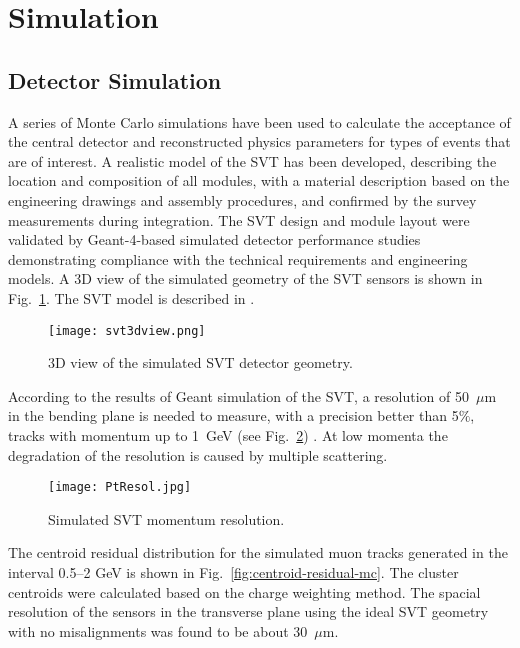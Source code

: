 \section{Simulation}

\subsection{Detector Simulation}

A series of Monte Carlo simulations have been used to calculate the acceptance of the central detector and reconstructed physics parameters for types of events that are of interest. A realistic model of the SVT has been developed, describing the location and composition of all modules, with a material description based on the engineering drawings and assembly procedures, and confirmed by the survey measurements during integration. The SVT design and module layout were validated by Geant-4-based simulated detector performance studies demonstrating compliance with the technical requirements and engineering models. A 3D view of the simulated geometry of the SVT sensors is shown in Fig.~\ref{fig:svt3dview}. The SVT model is described in \cite{MCNIM}. 

\begin{figure}[hbt] 
\centering 
\texttt{[image: svt3dview.png]}
\caption{3D view of the simulated SVT detector geometry.}
\label{fig:svt3dview}
\end{figure}

According to the results of Geant simulation of the SVT, a resolution of 50~$\mu$m in the bending plane is needed to measure, with a precision better than 5$\%$, tracks with momentum up to 1~GeV (see Fig.~\ref{fig:PtRes}) \cite{MC1,MC2}. At low momenta the degradation of the resolution is caused by multiple scattering.

\begin{figure}[hbt]
\texttt{[image: PtResol.jpg]}
\caption{Simulated SVT momentum resolution.}
\label{fig:PtRes}
\end{figure}

The centroid residual distribution for the simulated muon tracks generated in the interval 0.5--2 GeV is shown in Fig.~\ref{fig:centroid-residual-mc}. The cluster centroids were calculated based on the charge weighting method. The spacial resolution of the sensors in the transverse plane using the ideal SVT geometry with no misalignments was found to be about 30~$\mu$m. 

